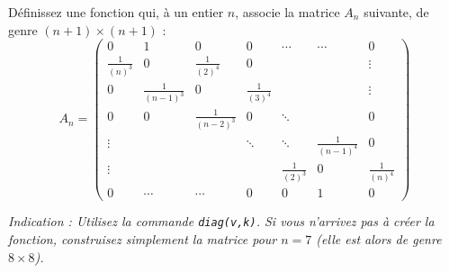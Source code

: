\begin{exercice}\label{exoMatlab0026}

\newcommand{\frtr}[1]{\frac{1}{(#1)^3}}
\newcommand{\frqu}[1]{\frac{1}{(#1)^4}}

Définissez une fonction qui, à un entier $n$, associe la matrice $A_n$ suivante, de genre $(n+1)\times (n+1)$ :
\[ A_n = \begin{pmatrix}
0 & 1 & 0 & 0 & \cdots & \cdots & 0 \\
\frtr{n} & 0 & \frqu{2} & 0 & & & \vdots \\
0 & \frtr{n-1} & 0 & \frqu{3} & & & \vdots \\
0 & 0 & \frtr{n-2} & 0 & \ddots & & 0 \\
\vdots & & & \ddots & \ddots & \frqu{n-1} & 0 \\
\vdots & & & & \frtr{2} & 0 & \frqu{n} \\
0 & \cdots & \cdots & 0 & 0 & 1 & 0 
\end{pmatrix} \]

\emph{Indication : Utilisez la commande \texttt{diag(v,k)}. Si vous n'arrivez pas à créer la fonction, construisez simplement la matrice pour $n=7$ (elle est alors de genre $8\times 8$).}

\end{exercice}
